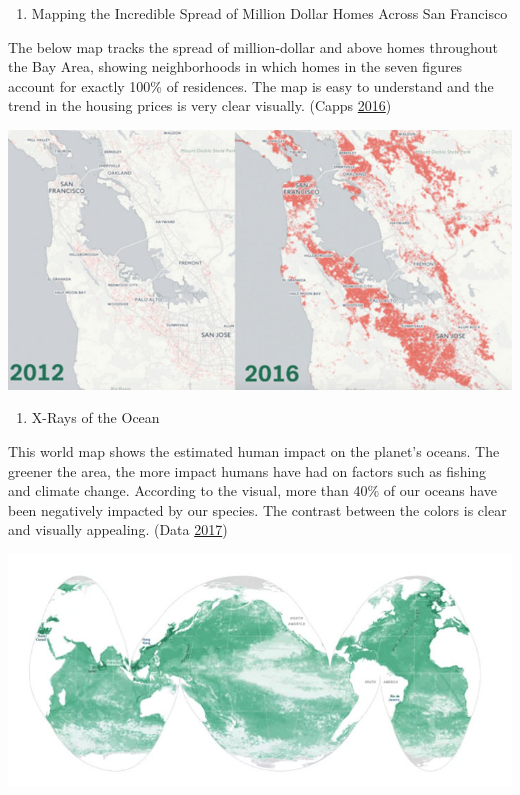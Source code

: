 \documentclass[]{book}
\providecommand{\tightlist}{%
  \setlength{\itemsep}{0pt}\setlength{\parskip}{0pt}}
\begin{document}
\begin{enumerate}
\def\labelenumi{\arabic{enumi}.}
\tightlist
\item
  Mapping the Incredible Spread of Million Dollar Homes Across San Francisco
\end{enumerate}

The below map tracks the spread of million-dollar and above homes throughout the Bay Area, showing neighborhoods in which homes in the seven figures account for exactly 100\% of residences. The map is easy to understand and the trend in the housing prices is very clear visually. (Capps \protect\hyperlink{ref-City-Lab}{2016})

\includegraphics{images/Not-San-Fran-No.jpg}

\begin{enumerate}
\def\labelenumi{\arabic{enumi}.}
\setcounter{enumi}{1}
\tightlist
\item
  X-Rays of the Ocean
\end{enumerate}

This world map shows the estimated human impact on the planet's oceans. The greener the area, the more impact humans have had on factors such as fishing and climate change. According to the visual, more than 40\% of our oceans have been negatively impacted by our species. The contrast between the colors is clear and visually appealing. (Data \protect\hyperlink{ref-Ocean-XRay}{2017})

\includegraphics{images/X-Rays-of-Ocean.jpg}
\end{document}
